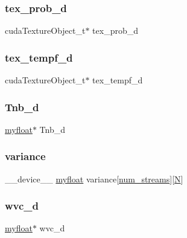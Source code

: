 \subsubsection{\texorpdfstring{tex\+\_\+prob\+\_\+d}{tex\_prob\_d}}
{\footnotesize\ttfamily cuda\+Texture\+Object\+\_\+t$\ast$ tex\+\_\+prob\+\_\+d}

\mbox{\label{mc__gpu_8cu_aff98f241432bdd0d6a9caccb19426859}} 
\subsubsection{\texorpdfstring{tex\+\_\+tempf\+\_\+d}{tex\_tempf\_d}}
{\footnotesize\ttfamily cuda\+Texture\+Object\+\_\+t$\ast$ tex\+\_\+tempf\+\_\+d}

\mbox{\label{mc__gpu_8cu_a1cf79772104f5b8b803bcbf4c6b5a053}} 
\subsubsection{\texorpdfstring{Tnb\+\_\+d}{Tnb\_d}}
{\footnotesize\ttfamily \hyperlink{param_8h_a5f097c9f3873af7be7fc156e6a06ca5e}{myfloat}$\ast$ Tnb\+\_\+d}

\mbox{\label{mc__gpu_8cu_aaf52a34d721b2c600e332ffc78a8ee68}} 
\subsubsection{\texorpdfstring{variance}{variance}}
{\footnotesize\ttfamily \+\_\+\+\_\+device\+\_\+\+\_\+ \hyperlink{param_8h_a5f097c9f3873af7be7fc156e6a06ca5e}{myfloat} variance\mbox{[}\hyperlink{param_8h_ad38ac11e843c3ad8714da6e5599cd1fb}{num\+\_\+streams}\mbox{]}\mbox{[}\hyperlink{mc__gpu_8cu_ab2b6b0c222cd1ce70d6a831f57241e59}{N}\mbox{]}}

\mbox{\label{mc__gpu_8cu_a64cbc4394e0b9bd53897ba9c9fb88fc4}} 
\subsubsection{\texorpdfstring{wvc\+\_\+d}{wvc\_d}}
{\footnotesize\ttfamily \hyperlink{param_8h_a5f097c9f3873af7be7fc156e6a06ca5e}{myfloat}$\ast$ wvc\+\_\+d}

